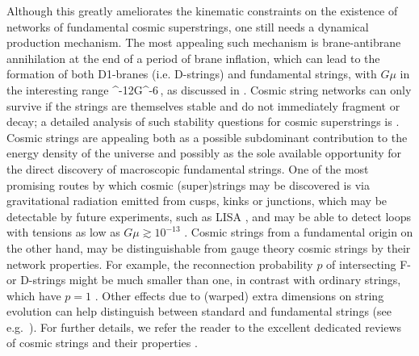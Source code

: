 Although this greatly ameliorates the kinematic constraints on the existence of networks of fundamental cosmic superstrings, one still needs a dynamical production mechanism. 
%
The most appealing such mechanism is brane-antibrane annihilation at the end of a period of brane inflation, which can lead to the formation of both D1-branes (i.e. D-strings) and fundamental strings, with $G\mu$ in the interesting range 
^{-12}\lesssim G\mu {}^{-6}\,,
\ee
as discussed in \cite{Sarangi:2002yt, Jones:2003da}.
Cosmic string networks can only survive if the strings are themselves stable and do not immediately fragment or decay; a detailed analysis of such stability questions for cosmic superstrings is \cite{Copeland:2003bj}.
%
Cosmic strings are appealing both as a possible subdominant contribution to the energy density of the universe and 
possibly as  the sole available opportunity for the direct discovery of  macroscopic fundamental strings. 
One of the most promising routes by which cosmic (super)strings may be discovered is via gravitational radiation emitted from cusps, kinks or junctions, which may be detectable by future experiments, such as LISA \cite{amaroseoane2017laser}, and may be able to  detect loops with tensions as low as $G\mu \gtrsim 10^{-13}$ \cite{Damour:2000wa,Damour:2001bk,Damour:2004kw,Siemens:2006vk,Polchinski:2007qc}.  
Cosmic strings from a fundamental origin on the other hand, may be distinguishable from gauge theory cosmic strings by their network properties. 
For example, the reconnection probability $p$ of intersecting F- or D-strings might be much smaller than one, in contrast with ordinary strings, which have $p=1$ \cite{Jackson:2004zg}. Other effects due to (warped) extra dimensions on string evolution can help distinguish between standard and fundamental strings (see e.g.~\cite{Avgoustidis:2004zt,Blanco-Pillado:2005uwc,Avgoustidis:2007ju,OCallaghan:2010mtk,OCallaghan:2010jrm,Avgoustidis:2012vc}).
%
For further details, we refer the reader to the excellent dedicated reviews of cosmic strings and their properties \cite{Hindmarsh:1994re, Polchinski:2004ia, Copeland:2009ga}.

\newpage


